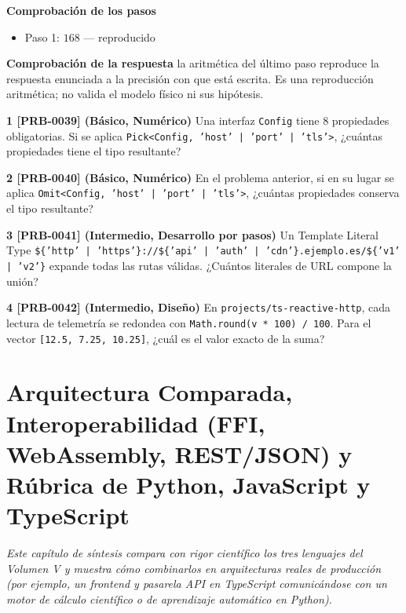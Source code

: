 \documentclass{book}
\begin{document}
\begin{tcolorbox}[title={Problema resuelto}, studiumworked, breakable]
\noindent\textbf{Comprobación de los pasos}
\begin{itemize}
\item Paso 1: $168$ — reproducido
\end{itemize}

\noindent\textbf{Comprobación de la respuesta} la aritmética del último paso reproduce la respuesta enunciada a la precisión con que está escrita. Es una reproducción aritmética; no valida el modelo físico ni sus hipótesis.
\end{tcolorbox}

\begin{tcolorbox}[title={Ejercicios}, studiumworked, breakable]

\noindent\textbf{1 [PRB-0039] (Básico, Numérico)}
Una interfaz \texttt{Config} tiene 8 propiedades obligatorias. Si se aplica \texttt{Pick<Config, 'host' | 'port' | 'tls'>}, ¿cuántas propiedades tiene el tipo resultante?

\noindent\textbf{2 [PRB-0040] (Básico, Numérico)}
En el problema anterior, si en su lugar se aplica \texttt{Omit<Config, 'host' | 'port' | 'tls'>}, ¿cuántas propiedades conserva el tipo resultante?

\noindent\textbf{3 [PRB-0041] (Intermedio, Desarrollo por pasos)}
Un Template Literal Type \texttt{\$\{'http' | 'https'\}://\$\{'api' | 'auth' | 'cdn'\}.ejemplo.es/\$\{'v1' | 'v2'\}} expande todas las rutas válidas. ¿Cuántos literales de URL compone la unión?

\noindent\textbf{4 [PRB-0042] (Intermedio, Diseño)}
En \texttt{projects/ts-reactive-http}, cada lectura de telemetría se redondea con \texttt{Math.round(v * 100) / 100}. Para el vector \texttt{[12.5, 7.25, 10.25]}, ¿cuál es el valor exacto de la suma?
\end{tcolorbox}

\chapter{Arquitectura Comparada, Interoperabilidad (FFI, WebAssembly, REST/JSON) y Rúbrica de Python, JavaScript y TypeScript}
\label{chap:cap08-interoperabilidad-comparativa-arquitectura-python-js-ts}

\noindent\textit{Este capítulo de síntesis compara con rigor científico los tres lenguajes del Volumen V y muestra cómo combinarlos en arquitecturas reales de producción (por ejemplo, un frontend y pasarela API en TypeScript comunicándose con un motor de cálculo científico o de aprendizaje automático en Python).}
\end{document}
